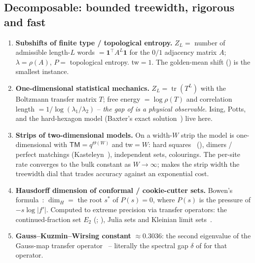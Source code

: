 \documentclass[11pt]{article}
\newcommand{\tr}{\operatorname{tr}}
\newcommand{\pressure}{P}
\theoremstyle{plain}
\theoremstyle{definition}
\theoremstyle{remark}
\begin{document}
\subsection{Decomposable: bounded treewidth, rigorous and fast}
\label{sec:cat-decomp}

\begin{enumerate}[leftmargin=1.5em,itemsep=3pt]
\item \textbf{Subshifts of finite type / topological entropy.} $Z_L=$ number of
admissible length-$L$ words $=\mathbf 1^\top A^L\mathbf 1$ for the $0/1$ adjacency
matrix $A$; $\lambda=\rho(A)$, $\pressure=$ topological entropy. \textsf{tw}$=1$. The
golden-mean shift () is the smallest instance.

\item \textbf{One-dimensional statistical mechanics.} $Z_L=\tr(T^L)$ with the
Boltzmann transfer matrix $T$; free energy $=\log\rho(T)$ and correlation length
$=1/\log(\lambda_1/\lambda_2)$ -- \emph{the gap of  is a physical
observable}. Ising, Potts, and the hard-hexagon model (Baxter's exact
solution~\citep{baxter1980hard,baxter1982exactly}) live here.

\item \textbf{Strips of two-dimensional models.} On a width-$W$ strip the model is
one-dimensional with $\textsf{TM}=q^{\Theta(W)}$ and \textsf{tw}$=W$: hard
squares~\citep{calkin1998number} (), dimers / perfect matchings
(Kasteleyn~\citep{kasteleyn1961statistics}), independent sets, colourings. The
per-site rate converges to the bulk constant as $W\to\infty$;  makes
the strip width the treewidth dial that trades accuracy against an exponential cost.

\item \textbf{Hausdorff dimension of conformal / cookie-cutter sets.} Bowen's
formula~\citep{bowen1979hausdorff}: $\dim_H=$ the root $s^\ast$ of
$\pressure(s)=0$, where $\pressure(s)$ is the pressure of $-s\log|f'|$. Computed to
extreme precision via transfer operators: the continued-fraction set $E_2$
(; \citet{jenkinson2001computing,jenkinson2018hundred}), Julia
sets and Kleinian limit sets~\citep{mcmullen1998hausdorff}.

\item \textbf{Gauss--Kuzmin--Wirsing constant} $\approx0.3036$: the second
eigenvalue of the Gauss-map transfer operator~\citep{wirsing1974gauss} -- literally
the spectral gap $\delta$ of  for that operator.


\end{enumerate}
\end{document}
